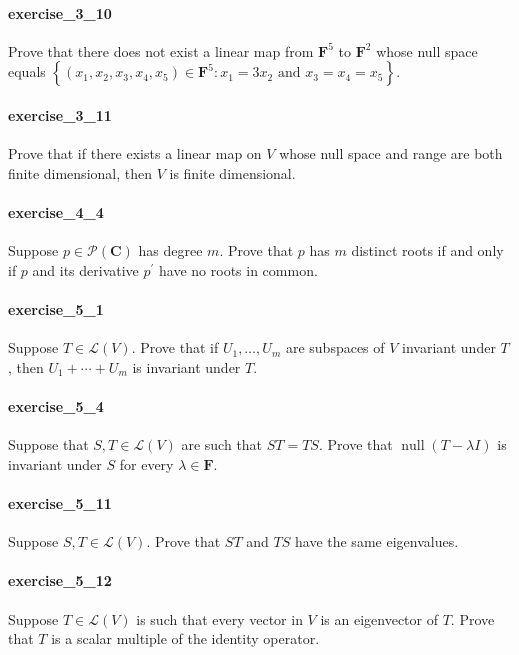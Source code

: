 \documentclass{article}
\begin{document}
\paragraph{exercise\_3\_10} Prove that there does not exist a linear map from $\mathbf{F}^{5}$ to $\mathbf{F}^{2}$ whose null space equals $\left\{\left(x_{1}, x_{2}, x_{3}, x_{4}, x_{5}\right) \in \mathbf{F}^{5}: x_{1}=3 x_{2} \text { and } x_{3}=x_{4}=x_{5}\right\} .$

\paragraph{exercise\_3\_11} Prove that if there exists a linear map on $V$ whose null space and range are both finite dimensional, then $V$ is finite dimensional.

\paragraph{exercise\_4\_4} Suppose $p \in \mathcal{P}(\mathbf{C})$ has degree $m$. Prove that $p$ has $m$ distinct roots if and only if $p$ and its derivative $p^{\prime}$ have no roots in common.

\paragraph{exercise\_5\_1} Suppose $T \in \mathcal{L}(V)$. Prove that if $U_{1}, \ldots, U_{m}$ are subspaces of $V$ invariant under $T$, then $U_{1}+\cdots+U_{m}$ is invariant under $T$.

\paragraph{exercise\_5\_4} Suppose that $S, T \in \mathcal{L}(V)$ are such that $S T=T S$. Prove that $\operatorname{null} (T-\lambda I)$ is invariant under $S$ for every $\lambda \in \mathbf{F}$.

\paragraph{exercise\_5\_11} Suppose $S, T \in \mathcal{L}(V)$. Prove that $S T$ and $T S$ have the same eigenvalues.

\paragraph{exercise\_5\_12} Suppose $T \in \mathcal{L}(V)$ is such that every vector in $V$ is an eigenvector of $T$. Prove that $T$ is a scalar multiple of the identity operator.
\end{document}
